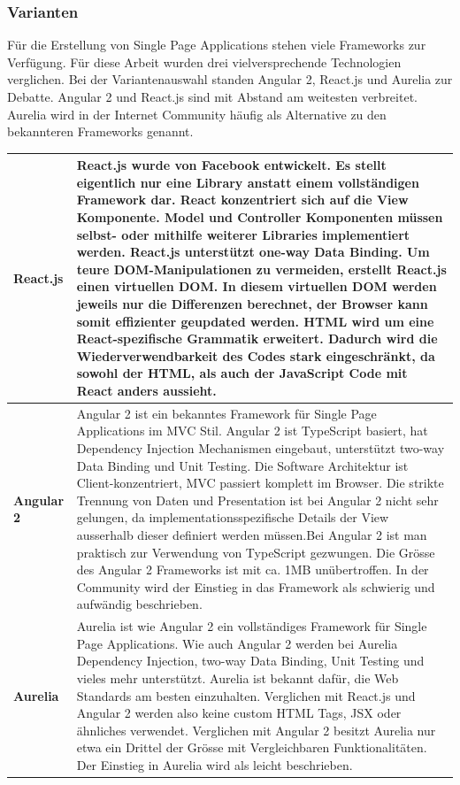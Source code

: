\subsubsection{Varianten}
Für die Erstellung von Single Page Applications stehen viele Frameworks zur Verfügung. Für diese Arbeit wurden drei vielversprechende Technologien verglichen. Bei der Variantenauswahl standen Angular 2, React.js und Aurelia zur Debatte. Angular 2 und React.js sind mit Abstand am weitesten verbreitet. Aurelia wird in der Internet Community häufig als Alternative zu den bekannteren Frameworks genannt.

\begin{longtable}{| p{4cm} | p{11.7cm} |}
\hline
\textbf{React.js} & React.js wurde von Facebook entwickelt. Es stellt eigentlich nur eine Library anstatt einem vollständigen Framework dar. React konzentriert sich auf die View Komponente. Model und Controller Komponenten müssen selbst- oder mithilfe weiterer Libraries implementiert werden. React.js unterstützt one-way Data Binding. Um teure DOM-Manipulationen zu vermeiden, erstellt React.js einen virtuellen DOM. In diesem virtuellen DOM werden jeweils nur die Differenzen berechnet, der Browser kann somit effizienter geupdated werden. HTML wird um eine React-spezifische Grammatik erweitert. Dadurch wird die Wiederverwendbarkeit des Codes stark eingeschränkt, da sowohl der HTML, als auch der JavaScript Code mit React anders aussieht. \newline   
\\ \hline  
  \textbf{Angular 2} & Angular 2 ist ein bekanntes Framework für Single Page Applications im MVC Stil. Angular 2 ist TypeScript basiert, hat Dependency Injection Mechanismen eingebaut, unterstützt two-way Data Binding und Unit Testing. Die Software Architektur ist Client-konzentriert, MVC passiert komplett im Browser. Die strikte Trennung von Daten und Presentation ist bei Angular 2 nicht sehr gelungen, da implementationsspezifische Details der View ausserhalb dieser definiert werden müssen.Bei Angular 2 ist man praktisch zur Verwendung von TypeScript gezwungen. Die Grösse des Angular 2 Frameworks ist mit ca. 1MB unübertroffen. In der Community wird der Einstieg in das Framework als schwierig und aufwändig beschrieben.
\\ \hline
\textbf{Aurelia} & Aurelia ist wie Angular 2 ein vollständiges Framework für Single Page Applications. Wie auch Angular 2 werden bei Aurelia Dependency Injection, two-way Data Binding, Unit Testing und vieles mehr unterstützt. Aurelia ist bekannt dafür, die Web Standards am besten einzuhalten. Verglichen mit React.js und Angular 2 werden also keine custom HTML Tags, JSX oder ähnliches verwendet. Verglichen mit Angular 2 besitzt Aurelia nur etwa ein Drittel der Grösse mit Vergleichbaren Funktionalitäten. Der Einstieg in Aurelia wird als leicht beschrieben. 
\\ \hline
\end{longtable}

